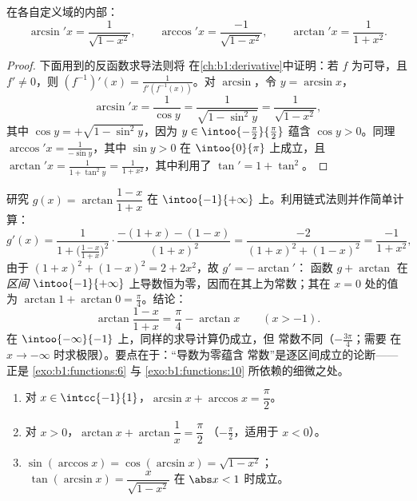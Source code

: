 \begin{proposition}[导数]\label{prop:b1:functions:arcderiv}
在各自定义域的内部：
\[
\arcsin' x = \frac{1}{\sqrt{1 - x^2}},
\qquad
\arccos' x = \frac{-1}{\sqrt{1 - x^2}},
\qquad
\arctan' x = \frac{1}{1 + x^2}.
\]
\end{proposition}

\begin{proof}
下面用到的反函数求导法则将
在\cref{ch:b1:derivative}中证明：若 $f$ 为可导，且
$f' \neq 0$，则 $(f^{-1})'(x) = \frac{1}{f'(f^{-1}(x))}$。对
$\arcsin$，令 $y = \arcsin x$，
\[
\arcsin' x = \frac{1}{\cos y}
= \frac{1}{\sqrt{1 - \sin^2 y}} = \frac{1}{\sqrt{1 - x^2}},
\]
其中 $\cos y = +\sqrt{1 - \sin^2 y}$，因为 $y \in
\intoo{-\frac\pi2}{\frac\pi2}$ 蕴含 $\cos y > 0$。同理
$\arccos' x = \frac{1}{-\sin y}$，其中 $\sin y > 0$ 在
$\intoo{0}{\pi}$ 上成立，且 $\arctan' x = \frac{1}{1 + \tan^2 y} =
\frac{1}{1 + x^2}$，其中利用了 $\tan' = 1 + \tan^2$。
\end{proof}

\begin{example}[识别隐藏的常数]\label{ex:b1:functions:hiddenconst}
研究 $g(x) = \arctan\dfrac{1 - x}{1 + x}$ 在 $\intoo{-1}
{+\infty}$ 上。利用链式法则并作简单计算：
\[
g'(x) = \frac{1}{1 + \bigl(\frac{1-x}{1+x}\bigr)^2}\cdot
\frac{-(1+x) - (1-x)}{(1+x)^2}
= \frac{-2}{(1+x)^2 + (1-x)^2}
= \frac{-1}{1 + x^2} ,
\]
由于 $(1+x)^2 + (1-x)^2 = 2 + 2x^2$，故 $g' = -\arctan'$：
函数 $g + \arctan$ 在\emph{区间}
$\intoo{-1}{+\infty}$ 上导数恒为零，因而在其上为常数；其在 $x =
0$ 处的值为 $\arctan 1 + \arctan 0 = \frac\pi4$。结论：
\[
\arctan\frac{1 - x}{1 + x} = \frac\pi4 - \arctan x
\qquad (x > -1) .
\]
在 $\intoo{-\infty}{-1}$ 上，同样的求导计算仍成立，但
常数不同（$-\frac{3\pi}4$；需要
在 $x \to -\infty$ 时求极限）。要点在于：“导数为零蕴含
常数”是逐区间成立的论断——正是
\cref{exo:b1:functions:6} 与
\cref{exo:b1:functions:10} 所依赖的细微之处。
\end{example}

\begin{proposition}[常用恒等式]\label{prop:b1:functions:arcidentities}
\begin{enumerate}
  \item 对 $x \in \intcc{-1}{1}$，$\arcsin x + \arccos x =
        \dfrac{\pi}{2}$。
  \item 对 $x > 0$，$\arctan x + \arctan\dfrac 1x = \dfrac{\pi}{2}$
        （$-\frac\pi2$，适用于 $x < 0$）。
  \item $\sin(\arccos x) = \cos(\arcsin x) = \sqrt{1 - x^2}$；
        $\;\tan(\arcsin x) = \dfrac{x}{\sqrt{1 - x^2}}$ 在
        $\abs x < 1$ 时成立。
\end{enumerate}
\end{proposition}

